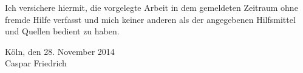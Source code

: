 
\noindent Ich versichere hiermit, die vorgelegte Arbeit in dem gemeldeten Zeitraum ohne fremde Hilfe verfasst und mich keiner anderen als der angegebenen Hilfsmittel und Quellen bedient zu haben.

\vfill

\noindent Köln, den 28. November 2014\\[1cm]

\noindent Caspar Friedrich